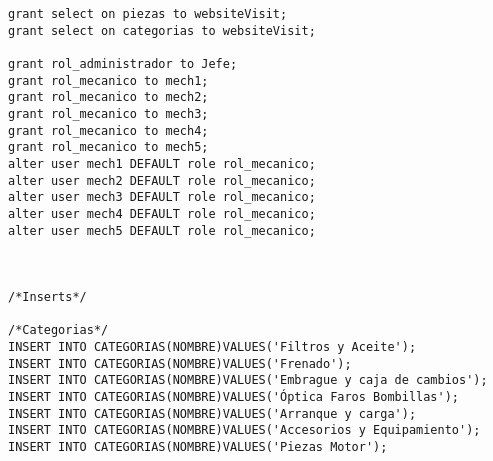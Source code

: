 \begin{lstlisting}
grant select on piezas to websiteVisit;
grant select on categorias to websiteVisit;

grant rol_administrador to Jefe;
grant rol_mecanico to mech1;
grant rol_mecanico to mech2;
grant rol_mecanico to mech3;
grant rol_mecanico to mech4;
grant rol_mecanico to mech5;
alter user mech1 DEFAULT role rol_mecanico;
alter user mech2 DEFAULT role rol_mecanico;
alter user mech3 DEFAULT role rol_mecanico;
alter user mech4 DEFAULT role rol_mecanico;
alter user mech5 DEFAULT role rol_mecanico;



/*Inserts*/

/*Categorias*/
INSERT INTO CATEGORIAS(NOMBRE)VALUES('Filtros y Aceite');
INSERT INTO CATEGORIAS(NOMBRE)VALUES('Frenado');
INSERT INTO CATEGORIAS(NOMBRE)VALUES('Embrague y caja de cambios');
INSERT INTO CATEGORIAS(NOMBRE)VALUES('Óptica Faros Bombillas');
INSERT INTO CATEGORIAS(NOMBRE)VALUES('Arranque y carga');
INSERT INTO CATEGORIAS(NOMBRE)VALUES('Accesorios y Equipamiento');
INSERT INTO CATEGORIAS(NOMBRE)VALUES('Piezas Motor');




\end{lstlisting}
